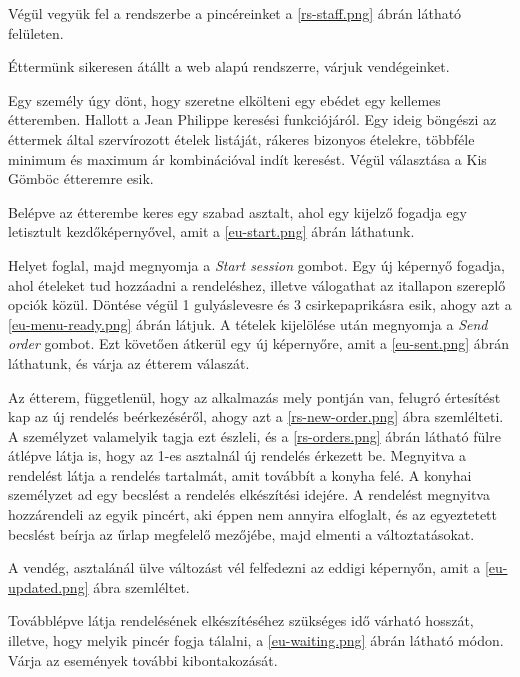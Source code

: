 Végül vegyük fel a rendszerbe a pincéreinket a \ref{rs-staff.png} ábrán látható felületen.


Éttermünk sikeresen átállt a web alapú rendszerre, várjuk vendégeinket.

Egy személy úgy dönt, hogy szeretne elkölteni egy ebédet egy kellemes étteremben. Hallott a Jean Philippe keresési funkciójáról. Egy ideig böngészi az éttermek által szervírozott ételek listáját, rákeres bizonyos ételekre, többféle minimum és maximum ár kombinációval indít keresést. Végül választása a Kis Gömböc étteremre esik.


Belépve az étterembe keres egy szabad asztalt, ahol egy kijelző fogadja egy letisztult kezdőképernyővel, amit a \ref{eu-start.png} ábrán láthatunk.

Helyet foglal, majd megnyomja a \emph{Start session} gombot. Egy új képernyő fogadja, ahol ételeket tud hozzáadni a rendeléshez, illetve válogathat az itallapon szereplő opciók közül. Döntése végül 1 gulyáslevesre és 3 csirkepaprikásra esik, ahogy azt a \ref{eu-menu-ready.png} ábrán látjuk. A tételek kijelölése után megnyomja a \emph{Send order} gombot. Ezt követően átkerül egy új képernyőre, amit a \ref{eu-sent.png} ábrán láthatunk, és várja az étterem válaszát.

Az étterem, függetlenül, hogy az alkalmazás mely pontján van, felugró értesítést kap az új rendelés beérkezéséről, ahogy azt a \ref{rs-new-order.png} ábra szemlélteti. A személyzet valamelyik tagja ezt észleli, és a \ref{rs-orders.png} ábrán látható fülre átlépve látja is, hogy az 1-es asztalnál új rendelés érkezett be. Megnyitva a rendelést látja a rendelés tartalmát, amit továbbít a konyha felé. A konyhai személyzet ad egy becslést a rendelés elkészítési idejére. A rendelést megnyitva hozzárendeli az egyik pincért, aki éppen nem annyira elfoglalt, és az egyeztetett becslést beírja az űrlap megfelelő mezőjébe, majd elmenti a változtatásokat. \par


A vendég, asztalánál ülve változást vél felfedezni az eddigi képernyőn, amit a \ref{eu-updated.png} ábra szemléltet.

Továbblépve látja rendelésének elkészítéséhez szükséges idő várható hosszát, illetve, hogy melyik pincér fogja tálalni, a \ref{eu-waiting.png} ábrán látható módon. Várja az események további kibontakozását.

